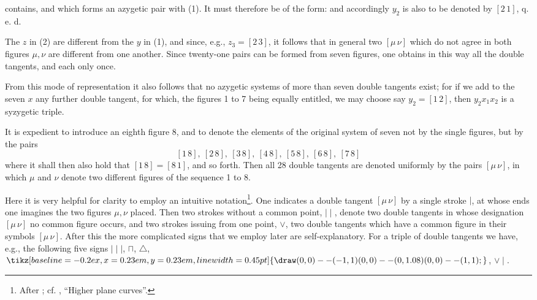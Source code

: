 \providecommand{\weberthreeup}{\mathord{\tikz[baseline=-0.2ex,x=0.23em,y=0.23em,line width=0.45pt]{\draw (0,0)--(-1,1) (0,0)--(0,1.08) (0,0)--(1,1);}}}
contains, and which forms an azygetic pair with (1). It must
therefore be of the form:
and accordingly $y_2$ is also to be denoted by $[2\,1]$, q. e. d.

The $z$ in (2) are different from the $y$ in (1), and since, e.g.,
$z_3 = [2\,3]$, it follows that in general two $[\mu\,\nu]$ which do not
agree in both figures $\mu, \nu$ are different from one another.
Since twenty-one pairs can be formed from seven figures, one
obtains in this way all the double tangents, and each only once.

From this mode of representation it also follows that no
azygetic systems of more than seven double tangents exist;
for if we add to the seven $x$ any further double tangent, for
which, the figures 1 to 7 being equally entitled, we may choose
say $y_2 = [1\,2]$, then $y_2 x_1 x_2$ is a syzygetic triple.

It is expedient to introduce an eighth figure 8, and to
denote the elements of the original system of seven not by the
single figures, but by the pairs
\[
[1\,8],\ [2\,8],\ [3\,8],\ [4\,8],\ [5\,8],\ [6\,8],\ [7\,8]
\]
where it shall then also hold that $[1\,8] = [8\,1]$, and so forth.
Then all 28 double tangents are denoted uniformly by the pairs
$[\mu\,\nu]$, in which $\mu$ and $\nu$ denote two different figures of the
sequence 1 to 8.

Here it is very helpful for clarity to employ an intuitive
notation\footnote{After ; cf. , ``Higher plane curves''.}. One indicates
a double tangent $[\mu\,\nu]$ by a single stroke $\mid$, at
whose ends one imagines the two figures $\mu, \nu$ placed.
Then two strokes without a common point, $\mid\mid$, denote two
double tangents in whose designation $[\mu\,\nu]$ no common
figure occurs, and two strokes issuing from one point, $\vee$, two
double tangents which have a common figure in their symbols $[\mu\,\nu]$.
After this the more complicated signs that we employ later are
self-explanatory. For a triple of double tangents we have, e.g., the
following five signs $\mid\mid\mid$, $\sqcap$, $\triangle$, $\weberthreeup$, $\vee\mid$.
